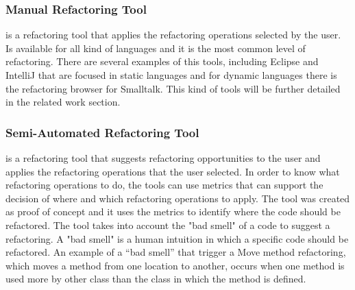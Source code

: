 \subsubsection{Manual Refactoring Tool}
is a refactoring tool that applies the refactoring operations selected by the user.
Is available for all kind of languages and it is the most common level of refactoring.
There are several examples of this tools, including Eclipse and IntelliJ that are focused in static languages and for dynamic languages there is the refactoring browser for Smalltalk.
This kind of tools will be further detailed in the related work section.






\subsubsection{Semi-Automated Refactoring Tool}
is a refactoring tool that suggests refactoring opportunities to the user and applies the refactoring operations that the user selected.
In order to know what refactoring operations to do, the tools can use metrics that can support the decision of where and which refactoring operations to apply.
The tool \cite{simon2001metrics} was created as proof of concept and it uses the metrics to identify where the code should be refactored.
The tool takes into account the "bad smell" of a code to suggest a refactoring.
A "bad smell" is a human intuition in which a specific code should be refactored.
An example of a ``bad smell'' that trigger a Move method refactoring, which moves a method from one location to another, occurs when one method is used more by other class than the class in which the method is defined.

